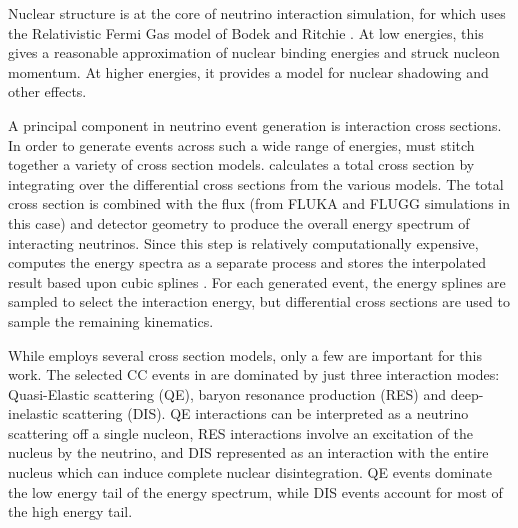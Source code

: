 Nuclear structure is at the core of neutrino interaction simulation, for which
\genie uses the Relativistic Fermi Gas model of Bodek and Ritchie
\cite{bodekritchie}.
At low energies, this gives a reasonable approximation of nuclear binding
energies and struck nucleon momentum.
At higher energies, it provides a model for nuclear shadowing and other
effects.


A principal component in neutrino event generation is interaction cross sections.  In order to generate events across such a wide range of energies, \genie must stitch together a variety of cross section models.  \genie calculates a total cross section by integrating over the differential cross sections from the various models.  The total cross section is combined with the flux (from FLUKA and FLUGG simulations in this case) and detector geometry to produce the overall energy spectrum of interacting neutrinos.
Since this step is relatively computationally expensive, \genie computes the
energy spectra as a separate process and stores the interpolated result
based upon cubic splines \cite{atkinson1978introduction}.
For each generated event, the energy splines are sampled to select the interaction energy, but differential cross sections are used to sample the remaining kinematics.

While \genie employs several cross section models, only a
few are important for this work.
The selected \numu CC events in \nova are dominated by just three interaction modes: Quasi-Elastic scattering (QE),  baryon resonance production (RES) and deep-inelastic scattering (DIS).
QE interactions can be interpreted as a neutrino scattering off a single
nucleon, RES interactions involve an excitation
of the nucleus by the neutrino, and DIS represented as an interaction
with the entire nucleus which can induce complete
nuclear disintegration.
QE events dominate the low energy tail of the energy spectrum, while DIS events account for most of the high energy tail.

